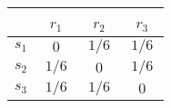 \documentclass[10pt]{standalone}
\begin{document}
 \begin{tabular}{c|c|c|c|} \setlength\tabcolsep{0.4cm} 
        & \, $r_1$ \, &  \, $r_2$ \, & \, $r_3$ \, \\ \hline 
  $s_1$ & $0$ & $1/6$ & $1/6$  \\ \hline
  $s_2$ & $1/6$ & $0$ & $1/6$  \\ \hline
  $s_3$ & $1/6$ & $1/6$ & $0$ \\ \hline 
  \end{tabular}
  \phantom{sssssss}
\end{document}
